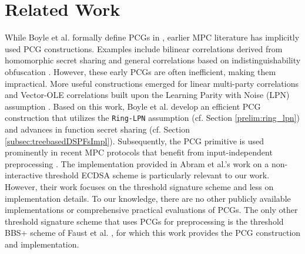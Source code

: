 \section{Related Work}
While Boyle et al. formally define PCGs in \cite{boyle2019efficient}, earlier MPC literature has implicitly used PCG constructions. Examples include bilinear correlations derived from homomorphic secret sharing \cite{boyle2017homomorphic} and general correlations based on indistinguishability obfuscation \cite{halevi2016secure}. However, these early PCGs are often inefficient, making them impractical. More useful constructions emerged for linear multi-party correlations \cite{cramer2005share, gilboa1999compressing} and Vector-OLE correlations built upon the Learning Parity with Noise (LPN) assumption \cite{boyle2018compressingVole, schoppmann2019distributedVole}. Based on this work, Boyle et al. develop an efficient PCG construction \cite{boyle2019efficient, boyle2020efficient} that utilizes the \texttt{Ring-LPN} assumption (cf. Section \ref{prelim:ring_lpn}) and advances in function secret sharing \cite{boyle2015function, boyle2016function} (cf. Section \ref{subsec:treebasedDSPFsImpl}). Subsequently, the PCG primitive is used prominently in recent MPC protocols that benefit from input-independent preprocessing \cite{bui2022private, abram2022low, wagh2022barnowl, dittmer2022authenticated, faust2023non, kondi2023two, bui2023improved}. The implementation provided in Abram et al.'s work on a non-interactive threshold ECDSA scheme \cite{abram2022low} is particularly relevant to our work. However, their work focuses on the threshold signature scheme and less on implementation details. To our knowledge, there are no other publicly available implementations or comprehensive practical evaluations of PCGs. The only other threshold signature scheme that uses PCGs for preprocessing is the threshold BBS+ scheme of Faust et al. \cite{faust2023non}, for which this work provides the PCG construction and implementation.
